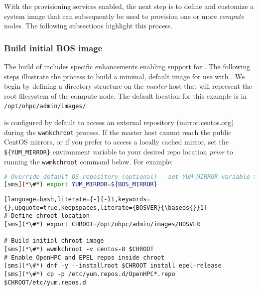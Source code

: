 With the provisioning services enabled, the next step is to define and
customize a system image that can subsequently be used to provision one or more
{\em compute} nodes. The following subsections highlight this process.

\subsubsection{Build initial BOS image} \label{sec:assemble_bos}
The \OHPC{} build of \Warewulf{} includes specific enhancements enabling support for
\baseOS{}. The following steps illustrate the process to build a minimal, default
image for use with \Warewulf{}. We begin by defining a directory structure on the
{\em master} host that will represent the root filesystem of the compute node. The
default location for this example is in
\texttt{/opt/ohpc/admin/images/\baseos{}}.

\begin{center}
  \begin{tcolorbox}[]
    \small \Warewulf{} is configured by default to access an external
    repository (mirror.centos.org) during the \texttt{wwmkchroot} process.  If
    the master host cannot reach the public CentOS mirrors, or if you prefer to
    access a locally cached mirror, set the \texttt{\$\{YUM\_MIRROR\}}
    environment variable to your desired repo location {\em prior} to running
    the \texttt{wwmkchroot} command below. For example:

\begin{lstlisting}[language=bash,keywords={}]
# Override default OS repository (optional) - set YUM_MIRROR variable to desired repo location
[sms](*\#*) export YUM_MIRROR=${BOS_MIRROR}
\end{lstlisting}

\end{tcolorbox}
\end{center}

\begin{lstlisting}[language=bash,literate={-}{-}1,keywords={},upquote=true,keepspaces,literate={BOSVER}{\baseos{}}1]
# Define chroot location
[sms](*\#*) export CHROOT=/opt/ohpc/admin/images/BOSVER

# Build initial chroot image
[sms](*\#*) wwmkchroot -v centos-8 $CHROOT
# Enable OpenHPC and EPEL repos inside chroot
[sms](*\#*) dnf -y --installroot $CHROOT install epel-release
[sms](*\#*) cp -p /etc/yum.repos.d/OpenHPC*.repo $CHROOT/etc/yum.repos.d
\end{lstlisting}
